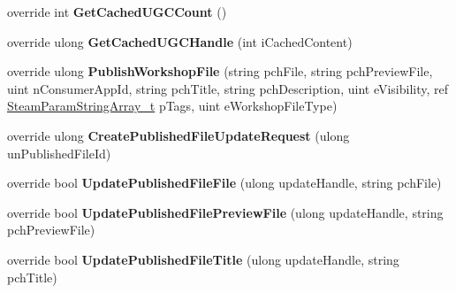 \begin{DoxyCompactItemize}
override int {\bfseries Get\+Cached\+U\+G\+C\+Count} ()
\item 
\mbox{\label{class_valve_1_1_steamworks_1_1_c_steam_remote_storage_ac6ece91c2dec37f5135d7e723c15f532}} 
override ulong {\bfseries Get\+Cached\+U\+G\+C\+Handle} (int i\+Cached\+Content)
\item 
\mbox{\label{class_valve_1_1_steamworks_1_1_c_steam_remote_storage_a5be4146cef1209c8d48b29cfdf12d2d4}} 
override ulong {\bfseries Publish\+Workshop\+File} (string pch\+File, string pch\+Preview\+File, uint n\+Consumer\+App\+Id, string pch\+Title, string pch\+Description, uint e\+Visibility, ref \hyperlink{struct_valve_1_1_steamworks_1_1_steam_param_string_array__t}{Steam\+Param\+String\+Array\+\_\+t} p\+Tags, uint e\+Workshop\+File\+Type)
\item 
\mbox{\label{class_valve_1_1_steamworks_1_1_c_steam_remote_storage_a0a21362d76e87874751e87c0ba1ab6fe}} 
override ulong {\bfseries Create\+Published\+File\+Update\+Request} (ulong un\+Published\+File\+Id)
\item 
\mbox{\label{class_valve_1_1_steamworks_1_1_c_steam_remote_storage_a1c46b5a6c69b54434beb298bd547f9e0}} 
override bool {\bfseries Update\+Published\+File\+File} (ulong update\+Handle, string pch\+File)
\item 
\mbox{\label{class_valve_1_1_steamworks_1_1_c_steam_remote_storage_a08e37642b03b3d9bbf0a4a8a425c8107}} 
override bool {\bfseries Update\+Published\+File\+Preview\+File} (ulong update\+Handle, string pch\+Preview\+File)
\item 
\mbox{\label{class_valve_1_1_steamworks_1_1_c_steam_remote_storage_adca84ba955e8e433ae1794df082f232a}} 
override bool {\bfseries Update\+Published\+File\+Title} (ulong update\+Handle, string pch\+Title)
\item 
\mbox{\label{class_valve_1_1_steamworks_1_1_c_steam_remote_storage_a35fc01293cac99a06c7e779fbf548944}} 

\end{DoxyCompactItemize}
